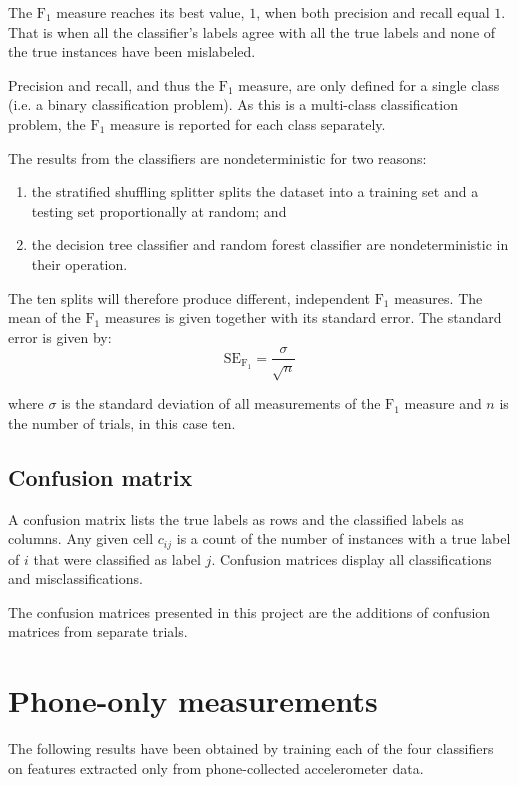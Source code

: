       The $\mathrm{F}_1$ measure reaches its best value, $1$, when both precision and recall equal $1$. That is when all the classifier's labels agree with all the true labels and none of the true instances have been mislabeled.
      
      Precision and recall, and thus the $\mathrm{F}_1$ measure, are only defined for a single class (i.e. a binary classification problem). As this is a multi-class classification problem, the $\mathrm{F}_1$ measure is reported for each class separately.
      
      The results from the classifiers are nondeterministic for two reasons:
      \begin{enumerate}
        \item the stratified shuffling splitter splits the dataset into a training set and a testing set proportionally at random; and
        \item the decision tree classifier and random forest classifier are nondeterministic in their operation.
      \end{enumerate}
      
      The ten splits will therefore produce different, independent $\mathrm{F}_1$ measures. The mean of the $\mathrm{F}_1$ measures is given together with its standard error. The standard error is given by:
      $$\mathrm{SE}_{\mathrm{F}_1} = \frac{\sigma}{\sqrt{n}}$$
      
      where $\sigma$ is the standard deviation of all measurements of the $\mathrm{F}_1$ measure and $n$ is the number of trials, in this case ten.
        
    \subsection {Confusion matrix}
      A confusion matrix lists the true labels as rows and the classified labels as columns. Any given cell $c_{ij}$ is a count of the number of instances with a true label of $i$ that were classified as label $j$. Confusion matrices display all classifications and misclassifications.
      
      The confusion matrices presented in this project are the additions of confusion matrices from separate trials.
    
  
  \section{Phone-only measurements}
    The following results have been obtained by training each of the four classifiers on features extracted only from phone-collected accelerometer data.
    
